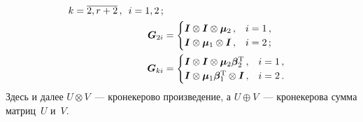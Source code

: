 \begin{multicols}{2}
\begin{align*}
 k=\overline{2,r+2}\,, \enskip
 i=1,2\,;\\
\boldsymbol{G}_{2i}&=
\begin{cases}
\boldsymbol{I}\otimes \boldsymbol{I}\otimes
\boldsymbol{\mu}_2\,, & i=1\,,\\
\boldsymbol{I} \otimes \boldsymbol{\mu}_1 \otimes \boldsymbol{I}\,, & i=2\,;
\end{cases}
\\
\boldsymbol{G}_{ki}&=
\begin{cases}
\boldsymbol{I}\otimes \boldsymbol{I}\otimes
\boldsymbol{\mu}_2\boldsymbol{\beta}_2^{\mathrm{T}}\,, & i=1\,,\\
\boldsymbol{I} \otimes \boldsymbol{\mu}_1\boldsymbol{\beta}_1^{\mathrm{T}} \otimes \boldsymbol{I}\,, & i=2\,.
\end{cases}
\end{align*}
Здесь и далее $U\otimes V$~--- кронекерово произведение, а $U\oplus V$~--- кронекерова сумма матриц~$U$ и~$V$.


\end{multicols}
